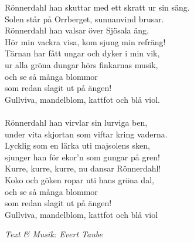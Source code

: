 \vspace{10pt}
Rönnerdahl han skuttar med ett skratt ur sin säng.\\
Solen står på Orrberget, sunnanvind brusar.\\
Rönnerdahl han valsar över Sjösala äng.\\
Hör min vackra visa, kom sjung min refräng!\\
Tärnan har fått ungar och dyker i min vik,\\
ur alla gröna dungar hörs finkarnas musik,\\
och se så många blommor\\
som redan slagit ut på ängen!\\
Gullviva, mandelblom, kattfot och blå viol.\\
\\
Rönnerdahl han virvlar sin lurviga ben,\\
under vita skjortan som viftar kring vaderna.\\
Lycklig som en lärka uti majsolens sken,\\
sjunger han för ekor'n som gungar på gren!\\
Kurre, kurre, kurre, nu dansar Rönnerdahl!\\
Koko och göken ropar uti hans gröna dal,\\
och se så många blommor\\
som redan slagit ut på ängen!\\
Gullviva, mandelblom, kattfot och blå viol
\par
\vspace{10pt}
{\footnotesize\textit{Text \& Musik: Evert Taube}}
